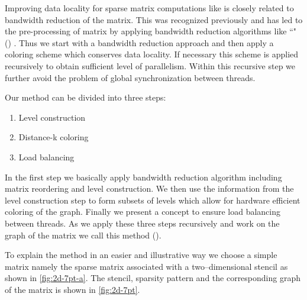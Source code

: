 Improving data locality for sparse matrix computations like \SpMV  is closely related to bandwidth reduction of the matrix. This was recognized previously and has led to the pre-processing of matrix by applying bandwidth reduction algorithms like ``\RCMfull" (\RCM) \cite{RCM,RCM_Sparse_computation}. Thus we start  with a bandwidth reduction approach and then apply a coloring scheme which conserves data locality. If necessary this scheme is applied recursively to obtain sufficient level of parallelism. Within this recursive step we further avoid the problem of global synchronization between threads.

 
Our method can be divided into three steps:
\begin{enumerate}
	\item Level construction
	\item Distance-k coloring
	\item Load balancing
\end{enumerate}

In the first step we basically apply bandwidth reduction algorithm including matrix reordering and level construction. We then use the information from the level construction step to form subsets of levels which allow for hardware efficient \DK coloring of the graph. Finally we present a concept to ensure load balancing between threads. As we apply these three steps recursively and work on the graph of the matrix we call this method  \RACE (\RACEfull).



To explain the method in an easier and illustrative way we choose a simple matrix namely the sparse matrix associated with a two--dimensional stencil as shown in \cref{fig:2d-7pt-a}. The stencil, sparsity pattern and the corresponding graph of the matrix is shown in \cref{fig:2d-7pt}.

